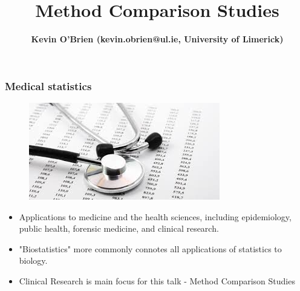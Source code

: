 \documentclass[compress]{beamer}        %
\title
	{
		{\huge Method Comparison Studies \\[0.3cm] }
	}
\author[Kevin O'Brien]{{\bf Kevin O'Brien (kevin.obrien@ul.ie, University of Limerick)}}
\institute[University of Limerick, Maths \& Stats Dept]{}
\date{}
\begin{document}
		
		\begin{frame}
			\vspace{-0.4cm}
			\titlepage
			
		\end{frame}
		
		
		\begin{frame}
			\frametitle{Medical statistics }
			\large
			\begin{figure}
				\centering
				\includegraphics[width=0.4\linewidth]{images/medstats}
			\end{figure}
			
			\begin{itemize}
				\item Applications to medicine and the health sciences, including epidemiology, public health, forensic medicine, and clinical research. 
				\item "Biostatistics" more commonly connotes all applications of statistics to biology.
				\item Clinical Research is main focus for this talk - Method Comparison Studies
			\end{itemize}
		\end{frame}	
		
%				
%				
%				
%		
		
\end{document}
